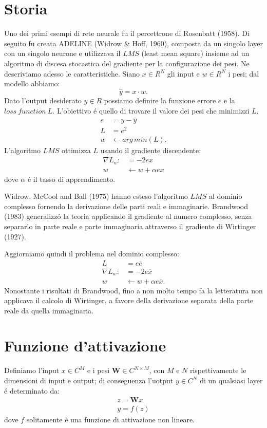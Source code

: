 \documentclass[a4paper,10pt]{article}
\date{15/05/2019}
\begin{document}
 \section{Storia}
 Uno dei primi esempi di rete neurale fu il percettrone di Rosenbatt (1958). Di seguito fu creata ADELINE (Widrow \& Hoff, 1960), composta da un singolo layer con un singolo neurone e utilizzava il $LMS$ (least mean square) insieme ad un algoritmo di discesa stocastica del gradiente per la configurazione dei pesi. Ne descriviamo adesso le caratteristiche. Siano $x \in R^N$ gli input e $w \in R^N$ i pesi; dal modello abbiamo:
 \begin{equation}
  \widehat{y} = x \cdot w.
 \end{equation}
Dato l'output desiderato $y \in R$ possiamo definire la funzione errore $e$ e la $loss \ function \ L$. L'obiettivo \'e quello di trovare il valore dei pesi che minimizzi $L$.
\begin{align}
 e &= y - \widehat{y}\\
 L &= e^2\\
 w &\leftarrow arg \, min(L).
\end{align}
L'algoritmo $LMS$ ottimizza $L$ usando il gradiente discendente:
\begin{align}
 \nabla L_w: &= -2ex\\
 w &\leftarrow w + \alpha ex
\end{align}
dove $\alpha$ \'e il tasso di apprendimento. 

Widrow, McCool and Ball (1975) hanno esteso l'algoritmo $LMS$ al dominio complesso fornendo la derivazione delle parti reali e immaginarie. Brandwood (1983) generalizz\'o la teoria applicando il gradiente al numero complesso, senza separarlo in parte reale e parte immaginaria attraverso il gradiente di Wirtinger (1927). 

Aggiorniamo quindi il problema nel dominio complesso:
\begin{align}
 L &= e \overline{e}\\
 \nabla L_w : &= -2e\overline{x}\\
 w &\leftarrow w + \alpha e \overline{x}.
\end{align}
Nonostante i risultati di Brandwood, fino a non molto tempo fa la letteratura non applicava il calcolo di Wirtinger, a favore della derivazione separata della parte reale da quella immaginaria. 

\section{Funzione d'attivazione}
Definiamo l'input $x \in C^M$ e i pesi $\textbf{W} \in C^{N\times M}$, con $M$ e $N$ rispettivamente le dimensioni di input e output; di conseguenza l'uotput $y \in C^N$ di un qualsiasi layer \'e determinato da:
\begin{align}
 z = \textbf{W} x\\
 y = f(z)
\end{align}
dove $f$ solitamente è una funzione di attivazione non lineare.
\end{document}
